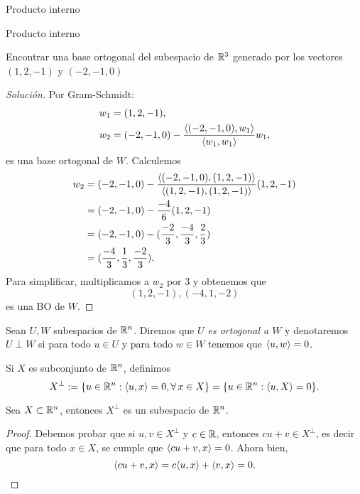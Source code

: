 \begin{chapter}{Producto interno}
\begin{section}{Producto interno}
        \begin{ejemplo*}
            Encontrar una base ortogonal del subespacio de $\mathbb R^3$ generado por los vectores $(1,2,-1)$ y $(-2,-1,0)$
            \begin{proof}[Solución] Por Gram-Schmidt:
                \begin{align*}
                w_1 &= (1,2,-1),  \\
                w_2 &= (-2,-1,0) - \frac{\langle (-2,-1,0),w_1\rangle}{\langle w_1,w_1\rangle}w_1,
                \end{align*}
                es una base ortogonal de $W$. Calculemos 
                \begin{align*}
                    w_2  &= (-2,-1,0) - \frac{\langle (-2,-1,0),(1,2,-1)\rangle}{\langle(1,2,-1),(1,2,-1)\rangle}(1,2,-1)\\
                    &= (-2,-1,0) - \frac{-4}{6}(1,2,-1) \\
                    &= (-2,-1,0) - (\frac{-2}{3},\frac{-4}{3},\frac{2}{3}) \\
                    &= (\frac{-4}{3},\frac{1}{3},\frac{-2}{3}).
                \end{align*}
                Para simplificar, multiplicamos a $w_2$ por $3$ y obtenemos que
                \begin{equation*}
                    (1,2,-1), (-4,1,-2)
                \end{equation*} 
                es una BO de $W$. 
                
            \end{proof}  
        \end{ejemplo*}
        

        
        \begin{definicion}  Sean $U, W$ subespacios de $\mathbb R^n$. Diremos que \textit{$U$ es ortogonal a $W$} y denotaremos $U \perp W$ si  para todo $u \in U$ y para todo $w \in W$ tenemos que $ \langle u,w\rangle =0$. 
            
            Si $X$ es subconjunto de $\mathbb R^n$,  definimos 
            $$
            X^\perp := \{u \in \mathbb R^n: \langle u,x\rangle = 0, \forall\, x \in X\} = \{u \in \mathbb R^n: \langle u,X\rangle = 0\}.
            $$ 
        \end{definicion}
        
        \begin{proposicion}
            Sea  $X \subset \mathbb R^n$, entonces $X^\perp$  es un subespacio de $\mathbb R^n$.
        \end{proposicion}
        \begin{proof}
            Debemos probar que si $u,v \in X^\perp$ y $c \in \mathbb R$,  entonces $cu+v \in X^\perp$,  es decir que para todo $x \in X$,  se cumple que  $\langle cu+v,x\rangle=0$. Ahora bien,
            $$
            \langle cu+v,x\rangle= c\langle u,x\rangle +\langle v,x\rangle= 0.
            $$
        \end{proof}
        

\end{section}
\end{chapter}
